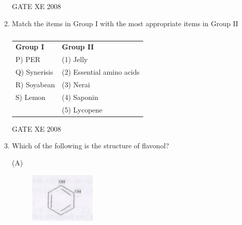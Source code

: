 \documentclass[12pt]{article}
\begin{document}
\begin{enumerate}
\begin{enumerate}
\end{enumerate}

GATE XE 2008

\item \noindent Match the items in Group I with the most appropriate items in Group II  

\begin{table}[H]     \centering     \caption{}     \label{}     \begin{tabular}{l l}
\textbf{Group I} & \textbf{Group II} \\
P) PER & (1) Jelly \\
Q) Synerisis & (2) Essential amino acids \\
R) Soyabean & (3) Nerai \\
S) Lemon & (4) Saponin \\
 & (5) Lycopene \\
\end{tabular} \end{table}  

\begin{enumerate}
\end{enumerate}

GATE XE 2008

\item Which of the following is the structure of flavonol? 

\begin{multicols}{2}

(A) \begin{figure}[H]
    \includegraphics[width=0.3\textwidth]{figs/ass1_i_q14_1.png}
    \caption{}
    \end{figure}


\end{multicols}
\end{enumerate}
\end{document}
